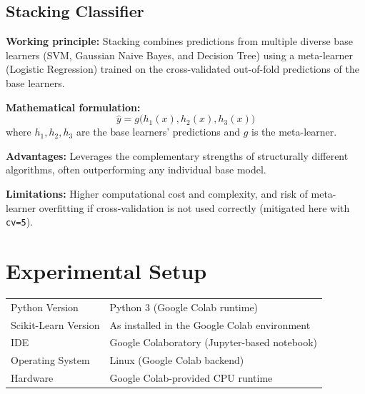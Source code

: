 \documentclass[12pt,a4paper]{article}
\begin{document}
\subsection*{Stacking Classifier}
\textbf{Working principle:} Stacking combines predictions from multiple diverse base learners (SVM, Gaussian Naive Bayes, and Decision Tree) using a meta-learner (Logistic Regression) trained on the cross-validated out-of-fold predictions of the base learners.

\textbf{Mathematical formulation:}
\[
\hat{y} = g\big(h_1(x), h_2(x), h_3(x)\big)
\]
where $h_1, h_2, h_3$ are the base learners' predictions and $g$ is the meta-learner.

\textbf{Advantages:} Leverages the complementary strengths of structurally different algorithms, often outperforming any individual base model.

\textbf{Limitations:} Higher computational cost and complexity, and risk of meta-learner overfitting if cross-validation is not used correctly (mitigated here with \texttt{cv=5}).

\section{Experimental Setup}
\begin{tabular}{ll}
\toprule
Python Version & Python 3 (Google Colab runtime)\\
Scikit-Learn Version & As installed in the Google Colab environment\\
IDE & Google Colaboratory (Jupyter-based notebook)\\
Operating System & Linux (Google Colab backend)\\
Hardware & Google Colab-provided CPU runtime\\
\bottomrule
\end{tabular}
\end{document}
